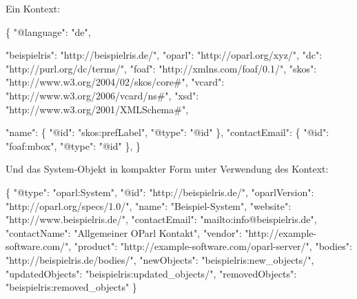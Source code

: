 \documentclass[,a4paper]{article}
\newenvironment{Shaded}{}{}
\newcommand{\DataTypeTok}[1]{\textcolor[rgb]{0.56,0.13,0.00}{{#1}}}
\newcommand{\StringTok}[1]{\textcolor[rgb]{0.25,0.44,0.63}{{#1}}}
\newcommand{\NormalTok}[1]{{#1}}
\begin{document}
Ein Kontext:

\begin{Shaded}
\begin{Highlighting}[]
\NormalTok{\{}
    \DataTypeTok{"@language"}\NormalTok{: }\StringTok{"de"}\NormalTok{,}

    \DataTypeTok{"beispielris"}\NormalTok{: }\StringTok{"http://beispielris.de/"}\NormalTok{,}
    \DataTypeTok{"oparl"}\NormalTok{: }\StringTok{"http://oparl.org/xyz/"}\NormalTok{,}
    \DataTypeTok{"dc"}\NormalTok{: }\StringTok{"http://purl.org/dc/terms/"}\NormalTok{,}
    \DataTypeTok{"foaf"}\NormalTok{: }\StringTok{"http://xmlns.com/foaf/0.1/"}\NormalTok{,}
    \DataTypeTok{"skos"}\NormalTok{: }\StringTok{"http://www.w3.org/2004/02/skos/core#"}\NormalTok{,}
    \DataTypeTok{"vcard"}\NormalTok{: }\StringTok{"http://www.w3.org/2006/vcard/ns#"}\NormalTok{,}
    \DataTypeTok{"xsd"}\NormalTok{: }\StringTok{"http://www.w3.org/2001/XMLSchema#"}\NormalTok{,}

    \DataTypeTok{"name"}\NormalTok{: \{}
        \DataTypeTok{"@id"}\NormalTok{: }\StringTok{"skos:prefLabel"}\NormalTok{,}
        \DataTypeTok{"@type"}\NormalTok{: }\StringTok{"@id"}
    \NormalTok{\},}
    \DataTypeTok{"contactEmail"}\NormalTok{: \{}
        \DataTypeTok{"@id"}\NormalTok{: }\StringTok{"foaf:mbox"}\NormalTok{,}
        \DataTypeTok{"@type"}\NormalTok{: }\StringTok{"@id"}
    \NormalTok{\},}
\NormalTok{\}}
\end{Highlighting}
\end{Shaded}

Und das System-Objekt in kompakter Form unter Verwendung des Kontext:

\begin{Shaded}
\begin{Highlighting}[]
\NormalTok{\{}
    \DataTypeTok{"@type"}\NormalTok{: }\StringTok{"oparl:System"}\NormalTok{,}
    \DataTypeTok{"@id"}\NormalTok{: }\StringTok{"http://beispielris.de/"}\NormalTok{,}
    \DataTypeTok{"oparlVersion"}\NormalTok{: }\StringTok{"http://oparl.org/specs/1.0/"}\NormalTok{,}
    \DataTypeTok{"name"}\NormalTok{: }\StringTok{"Beispiel-System"}\NormalTok{,}
    \DataTypeTok{"website"}\NormalTok{: }\StringTok{"http://www.beispielris.de/"}\NormalTok{,}
    \DataTypeTok{"contactEmail"}\NormalTok{: }\StringTok{"mailto:info@beispielris.de"}\NormalTok{,}
    \DataTypeTok{"contactName"}\NormalTok{: }\StringTok{"Allgemeiner OParl Kontakt"}\NormalTok{,}
    \DataTypeTok{"vendor"}\NormalTok{: }\StringTok{"http://example-software.com/"}\NormalTok{,}
    \DataTypeTok{"product"}\NormalTok{: }\StringTok{"http://example-software.com/oparl-server/"}\NormalTok{,}
    \DataTypeTok{"bodies"}\NormalTok{: }\StringTok{"http://beispielris.de/bodies/"}\NormalTok{,}
    \DataTypeTok{"newObjects"}\NormalTok{: }\StringTok{"beispielris:new_objects/"}\NormalTok{,}
    \DataTypeTok{"updatedObjects"}\NormalTok{: }\StringTok{"beispielris:updated_objects/"}\NormalTok{,}
    \DataTypeTok{"removedObjects"}\NormalTok{: }\StringTok{"beispielris:removed_objects"}
\NormalTok{\}}
\end{Highlighting}
\end{Shaded}
\end{document}
